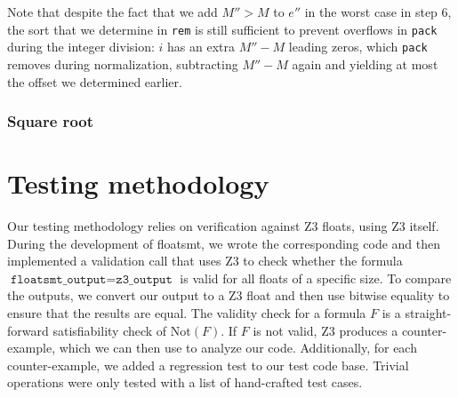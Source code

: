 \documentclass[a4paper,UKenglish,cleveref, autoref, thm-restate]{lipics-v2019}
\begin{document}
Note that despite the fact that we add $M'' > M$ to $e''$ in the worst case in step 6, the sort that we determine in \verb|rem| is still sufficient to prevent overflows in \verb|pack| during the integer division: $i$ has an extra $M'' - M$ leading zeros, which \verb|pack| removes during normalization, subtracting $M'' - M$ again and yielding at most the offset we determined earlier. 

\subsubsection{Square root}

\section{Testing methodology}
Our testing methodology relies on verification against Z3 floats, using Z3 itself. During the development of floatsmt, we wrote the corresponding code and then implemented a validation call that uses Z3 to check whether the formula $\texttt{floatsmt\_output} = \texttt{z3\_output}$ is valid for all floats of a specific size. To compare the outputs, we convert our output to a Z3 float and then use bitwise equality to ensure that the results are equal. The validity check for a formula $F$ is a straight-forward satisfiability check of $\text{Not}(F)$. If $F$ is not valid, Z3 produces a counter-example, which we can then use to analyze our code. Additionally, for each counter-example, we added a regression test to our test code base. Trivial operations were only tested with a list of hand-crafted test cases.
\end{document}
